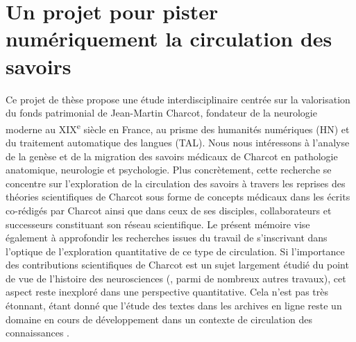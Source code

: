 \section{Un projet pour pister numériquement la circulation des savoirs}
Ce projet de thèse propose une étude interdisciplinaire centrée sur la valorisation du fonds patrimonial de Jean-Martin Charcot, fondateur de la neurologie moderne au XIX\textsuperscript{e} siècle en France, au prisme des humanités numériques (\textsc{HN}) et du traitement automatique des langues (\textsc{TAL}). Nous nous intéressons à l'analyse de la genèse et de la migration des savoirs médicaux de Charcot en pathologie anatomique, neurologie et psychologie. Plus concrètement, cette recherche se concentre sur l'exploration de la circulation des savoirs à travers les reprises des théories scientifiques de Charcot sous forme de concepts médicaux dans les écrits co-rédigés par Charcot ainsi que dans ceux de ses disciples, collaborateurs et successeurs constituant son \og{}réseau scientifique\fg{}. Le présent mémoire vise également à approfondir les recherches issues du travail de \citet{petkovic2023circulation} s'inscrivant dans l'optique de l'exploration quantitative de ce type de circulation. 
 Si l'importance des contributions scientifiques de Charcot est un sujet largement étudié du point de vue de l'histoire des neurosciences (\citealp{bogousslavsky2011following,broussolle2012,camargo2024}, parmi de nombreux autres travaux), cet aspect reste inexploré dans une perspective quantitative. Cela n'est pas très étonnant, étant donné que l'étude des textes dans les archives en ligne reste un domaine en cours de développement dans un contexte de circulation des connaissances \citep[p.~4]{milia2023}.
